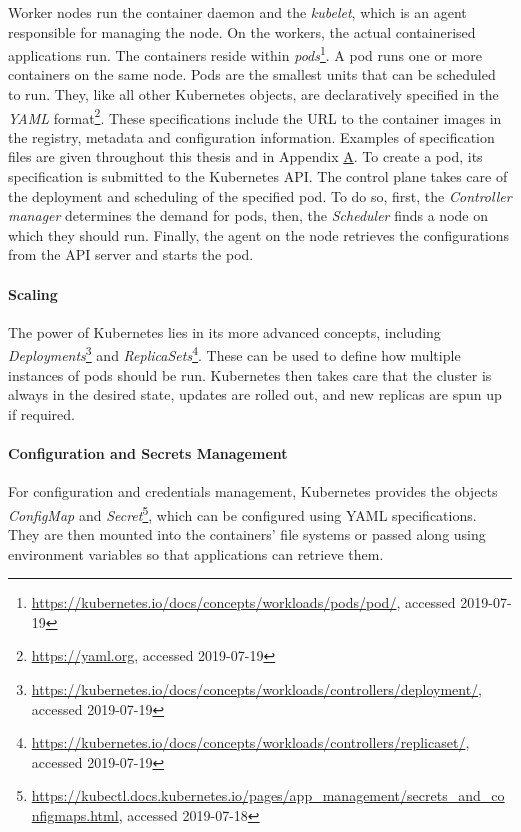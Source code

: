 Worker nodes run the container daemon and the \textit{kubelet}, which is an agent responsible for managing the node. On the workers, the actual containerised applications run. The containers reside within \textit{pods}\footnote{\url{https://kubernetes.io/docs/concepts/workloads/pods/pod/}, accessed 2019-07-19}. A pod runs one or more containers on the same node. Pods are the smallest units that can be scheduled to run. They, like all other Kubernetes objects, are declaratively specified in the \textit{YAML} format\footnote{\url{https://yaml.org}, accessed 2019-07-19}. These specifications include the URL to the container images in the registry, metadata and configuration information. Examples of specification files are given throughout this thesis and in Appendix \hyperref[apx:A]{A}. To create a pod, its specification is submitted to the Kubernetes API. The control plane takes care of the deployment and scheduling of the specified pod. To do so, first, the \textit{Controller manager} determines the demand for pods, then, the \textit{Scheduler} finds a node on which they should run. Finally, the  agent on the node retrieves the configurations from the API server and starts the pod. 

\paragraph{Scaling}

The power of Kubernetes lies in its more advanced concepts, including \textit{Deployments}\footnote{\url{https://kubernetes.io/docs/concepts/workloads/controllers/deployment/}, \\ accessed 2019-07-19} and \textit{ReplicaSets}\footnote{\url{https://kubernetes.io/docs/concepts/workloads/controllers/replicaset/}, \\ accessed 2019-07-19}. These can be used to define how multiple instances of pods should be run. Kubernetes then takes care that the cluster is always in the desired state, updates are rolled out, and new replicas are spun up if required.

\paragraph{Configuration and Secrets Management}

For configuration and credentials management, Kubernetes provides the objects \textit{ConfigMap} and \textit{Secret}\footnote{\url{https://kubectl.docs.kubernetes.io/pages/app_management/secrets_and_configmaps.html}, accessed 2019-07-18}, which can be configured using YAML specifications. They are then mounted into the containers' file systems or passed along using environment variables so that applications can retrieve them.

